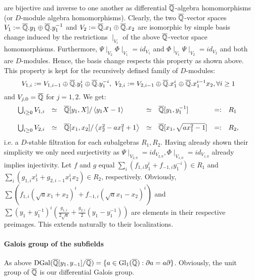 are bijective and inverse to one another as differential $\currfield$-algebra homomorphisms (or $D$-module algebra homomorphisms). Clearly, the two $\currfield$-vector spaces $V_1 := \currfield.y_1 \oplus \currfield.y_1^{-1}$ and $V_2 := \currfield.x_1 \oplus \currfield.x_2$ are isomorphic by simple basis change induced by the restrictions $\mid_{V_i}$ of the above $\currfield$-vector space homomorphisms. Furthermore, $\Psi \mid_{V_2} \Phi \mid_{V_1} = id_{V_1}$ and $\Phi \mid_{V_1} \Psi \mid_{V_2} = id_{V_2}$ and both are $D$-modules. Hence, the basis change respects this property as shown above. This property is kept for the recursively defined family of $D$-modules:
$$V_{1,i} := V_{1,i-1} \oplus \currfield.y_1^i \oplus \currfield.y_1^{-i},\ V_{2,i} := V_{2,i-1} \oplus \currfield.x_1^i \oplus \currfield.x_1^{i-1} x_2, \forall i \geq 1$$
and $V_{j,0} = \currfield$ for $j = 1, 2$. We get:
$$\bao{rclclcl}
\bigcup_{i \geq 0} V_{1, i} &\simeq& \currfield[y_1,X]/\left<y_1 X - 1\right> &\simeq& \currfield[y_1,y_1^{-1}] &=:& R_1\\
&&&&\\
\bigcup_{i \geq 0} V_{2,i} &\simeq& \currfield[x_1,x_2]/\left<x_2^2 - a x_1^2 + 1\right> &\simeq& \currfield[x_1,\sqrt{a x_1^2 - 1}] &=:& R_2,\\
\ea$$
i.e. a $D$-stable filtration for each subalgebras $R_1, R_2$. Having already shown their simplicity we only need surjectivity as $\Psi\mid_{V_{2,0}} = id_{V_{2,0}}, \Phi\mid_{V_{1,0}} = id_{V_{1,0}}$ already implies injectivity. Let $f$ and $g$ equal $\sum_i \left(f_{1,i} y_1^i + f_{-1,i} y_1^{-i}\right) \in R_1$ and $\sum_i \left(g_{1,i} x_1^i + g_{2,i-1} x_1^i x_2\right) \in R_2$, respectively. Obviously, $\sum \left(f_{1,i} (\sqrt{a} x_1 + x_2)^i + f_{-1,i} (\sqrt{a} x_1 - x_2)^i\right)$ and
$\sum (y_1 + y_1^{-1})^i \left(\frac{g_{1,i}}{2 \sqrt{a}} + \frac{g_{2,i}}{2} (y_1 - y_1^{-1})\right)$ are elements in their respective preimages. This extends naturally to their localizations.
\paragraph{Galois group of the subfields}
As above $\trm{DGal}(\currfield[y_1,y_{-1}]/\currfield) = \{a \in \trm{Gl}_1(\currfield) : \partial a = a \partial\}$. Obviously, the unit group of $\currfield$ is our differential Galois group.
